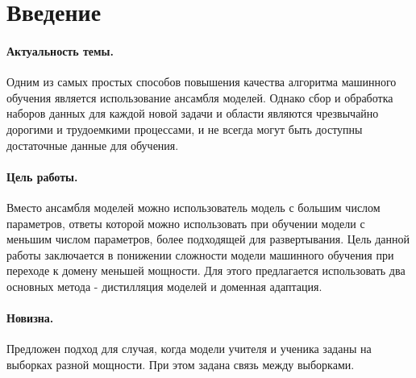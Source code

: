 \newpage


\section{Введение}
\paragraph{Актуальность темы.} Одним из самых простых способов повышения качества алгоритма машинного обучения является использование ансамбля моделей. Однако сбор и обработка наборов данных для каждой новой задачи и области являются чрезвычайно дорогими и трудоемкими процессами, и не всегда могут быть доступны достаточные данные для обучения.
\paragraph{Цель работы.} Вместо ансамбля моделей можно использователь модель с большим числом параметров, ответы которой можно использовать при обучении модели с меньшим числом параметров, более подходящей для развертывания. Цель данной работы заключается в понижении сложности модели машинного обучения при переходе к домену меньшей мощности. Для этого предлагается использовать два основных метода - дистилляция моделей и доменная адаптация.
\paragraph{Новизна.} Предложен подход для случая, когда модели учителя и ученика заданы на выборках разной мощности. При этом задана связь между выборками.
